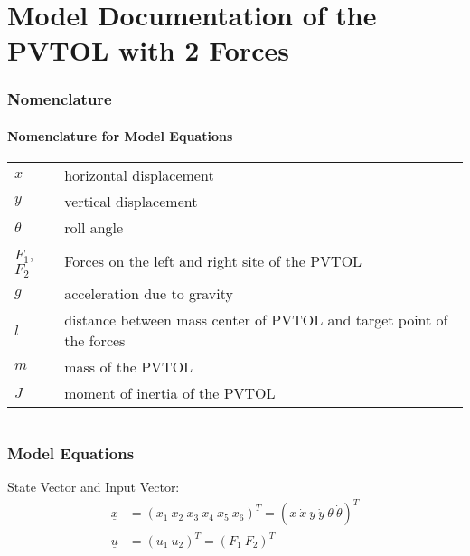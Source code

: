 \documentclass[10pt,a4paper]{article}
\begin{document}
	\part*{Model Documentation of the \\PVTOL with 2 Forces} %
	
	
	\section{Nomenclature} %
	\subsection{Nomenclature for Model Equations} %
	
	\begin{tabular}{ll}
		$x$ & horizontal displacement \\
		$y$ & vertical displacement \\
		$\theta$ & roll angle \\
		$F_1$, $F_2$ & Forces on the left and right site of the PVTOL \\
		$g$ & acceleration due to gravity \\
		$l$ & distance between mass center of PVTOL and target point of the forces \\
		$m$ & mass of the PVTOL \\
		$J$ & moment of inertia of the PVTOL		
	\end{tabular}

	
	\begin{tabular}{ll}
	\end{tabular}
	
	
	\section{Model Equations} %
	
	State Vector and Input Vector:
	\begin{align*}
		\underline{x} &= (x_1 \ x_2 \ x_3 \ x_4 \ x_5 \ x_6)^T = (x \ \dot{x} \ y \ \dot{y} \ \theta \ \dot{\theta})^T \\
		\underline{u} &= (u_1 \ u_2)^T = (F_1 \ F_2)^T
	\end{align*}
\end{document}
